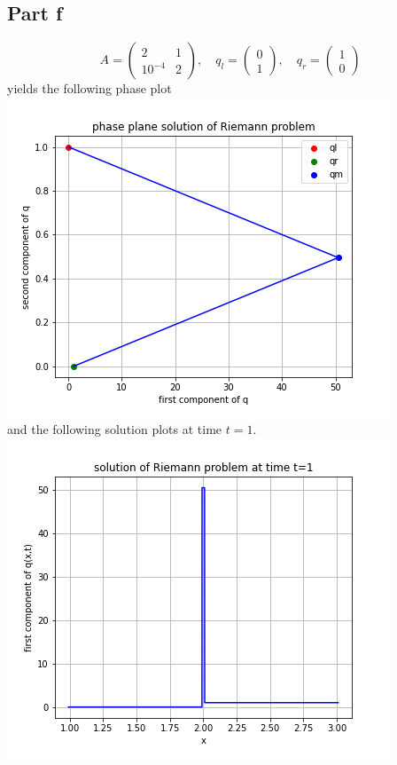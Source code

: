 \documentclass{article}
\begin{document}
\subsection{Part f}
\[
A=\begin{pmatrix}
	2&1\\10^{-4}&2
\end{pmatrix},\quad q_l=\begin{pmatrix}
	0\\1
\end{pmatrix},\quad q_r=\begin{pmatrix}
	1\\0
\end{pmatrix}
\]
yields the following phase plot\\
\includegraphics[scale=0.7]{partf.png}\\
and the following solution plots at time $t=1$.\\
\includegraphics[scale=0.7]{partf1.png}\\
\end{document}
